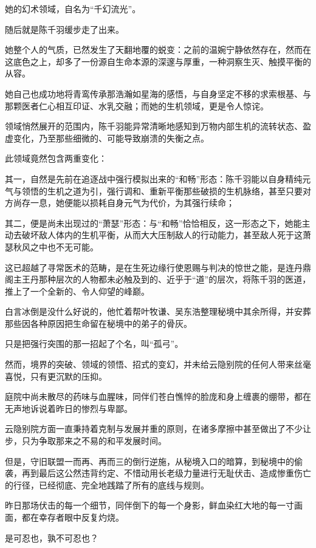 她的幻术领域，自名为“千幻流光”。

随后就是陈千羽缓步走了出来。

她整个人的气质，已然发生了天翻地覆的蜕变：之前的温婉宁静依然存在，然而在这底色之上，却多了一份源自生命本源的深邃与厚重，一种洞察生灭、触摸平衡的从容。

她自己也成功地将青鸾传承那浩瀚如星海的感悟，与自身坚定不移的求索根基、与那颗医者仁心相互印证、水乳交融；而她的生机领域，更是令人惊诧。

领域悄然展开的范围内，陈千羽能异常清晰地感知到万物内部生机的流转状态、盈虚变化，乃至那些细微的、可能导致崩溃的失衡之点。

此领域竟然包含两重变化：

其一，自然是先前在追逐战中强行模拟出来的“和畅”形态：陈千羽能以自身精纯元气与领悟的生机之道为引，强行调和、重新平衡那些破损的生机脉络，甚至只要对方尚存一息，她便能以损耗自身元气为代价，为其强行续命；

其二，便是尚未出现过的“萧瑟”形态：与“和畅”恰恰相反，这一形态之下，她能主动去破坏敌人体内的生机平衡，从而大大压制敌人的行动能力，甚至敌人死于这萧瑟秋风之中也不无可能。

这已超越了寻常医术的范畴，是在生死边缘行使恩赐与判决的惊世之能，是连丹鼎阁主王丹那种层次的人物都未必触及到的、近乎于“道”的层次，将陈千羽的医道，推上了一个全新的、令人仰望的峰巅。

白言冰倒是没什么好说的，他忙着帮叶牧谦、吴东浩整理秘境中其余所得，并安葬那些因各种原因把生命留在秘境中的弟子的骨灰。

只是把强行突围的那一招起了个名，叫“孤弓”。

\vspace{2em}

然而，境界的突破、领域的领悟、招式的变幻，并未给云隐别院的任何人带来丝毫喜悦，只有更沉默的压抑。

庭院中尚未散尽的药味与血腥味，同伴们苍白憔悴的脸庞和身上缠裹的绷带，都在无声地诉说着昨日的惨烈与卑鄙。

云隐别院方面一直秉持着克制与发展并重的原则，在诸多摩擦中甚至做出了不少让步，只为争取那来之不易的和平发展时间。

但是，守旧联盟一而再、再而三的倒行逆施，从秘境入口的暗算，到秘境中的偷袭，再到最后这公然违背约定、不惜动用长老级力量进行无耻伏击、造成惨重伤亡的行径，已经彻底、完全地践踏了所有的底线与规则。

昨日那场伏击的每一个细节，同伴倒下的每一个身影，鲜血染红大地的每一寸画面，都在幸存者眼中反复灼烧。

是可忍也，孰不可忍也？

